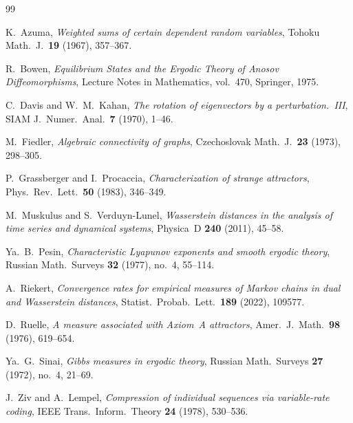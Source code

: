 \documentclass[11pt,reqno]{amsart}
\theoremstyle{remark}
\begin{document}
\begin{thebibliography}{99}

K.~Azuma, \emph{Weighted sums of certain dependent random variables}, Tohoku Math.\ J.\ \textbf{19} (1967), 357--367.

R.~Bowen, \emph{Equilibrium States and the Ergodic Theory of Anosov Diffeomorphisms}, Lecture Notes in Mathematics, vol.~470, Springer, 1975.

C.~Davis and W.~M.~Kahan, \emph{The rotation of eigenvectors by a perturbation.~III}, SIAM J.\ Numer.\ Anal.\ \textbf{7} (1970), 1--46.

M.~Fiedler, \emph{Algebraic connectivity of graphs}, Czechoslovak Math.\ J.\ \textbf{23} (1973), 298--305.

P.~Grassberger and I.~Procaccia, \emph{Characterization of strange attractors}, Phys.\ Rev.\ Lett.\ \textbf{50} (1983), 346--349.

M.~Muskulus and S.~Verduyn-Lunel, \emph{Wasserstein distances in the analysis of time series and dynamical systems}, Physica~D \textbf{240} (2011), 45--58.

Ya.~B.~Pesin, \emph{Characteristic Lyapunov exponents and smooth ergodic theory}, Russian Math.\ Surveys \textbf{32} (1977), no.~4, 55--114.

A.~Riekert, \emph{Convergence rates for empirical measures of Markov chains in dual and Wasserstein distances}, Statist.\ Probab.\ Lett.\ \textbf{189} (2022), 109577.

D.~Ruelle, \emph{A measure associated with Axiom~A attractors}, Amer.\ J.\ Math.\ \textbf{98} (1976), 619--654.

Ya.~G.~Sinai, \emph{Gibbs measures in ergodic theory}, Russian Math.\ Surveys \textbf{27} (1972), no.~4, 21--69.

J.~Ziv and A.~Lempel, \emph{Compression of individual sequences via variable-rate coding}, IEEE Trans.\ Inform.\ Theory \textbf{24} (1978), 530--536.

\end{thebibliography}
\end{document}
